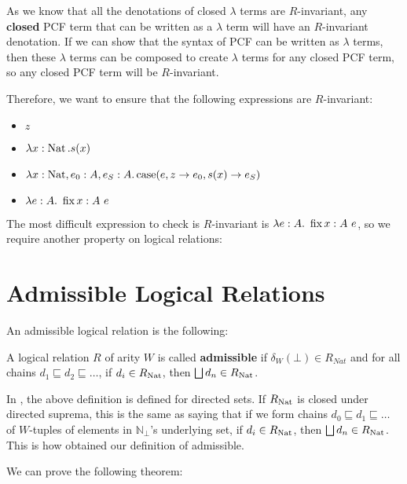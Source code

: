 As we know that all the denotations of closed $\lambda$ terms are $R$-invariant, any \textbf{closed} PCF term that can be written as a $\lambda$ term will have  an $R$-invariant denotation. If we can show that the syntax of PCF can be written as $\lambda$ terms, then these $\lambda$ terms can be composed to create $\lambda$ terms for any closed PCF term, so any closed PCF term will be $R$-invariant.

Therefore, we want to ensure that the following expressions are $R$-invariant:

\begin{itemize}
\item{$z$}
\item{$\lambda x: \operatorname{Nat}. s(x)$}
\item{$\lambda x: \operatorname{Nat}, e_0 : A, e_S: A. \operatorname{case}(e,z \to e_0,s(x) \to e_S)$}
\item{$\lambda e: A . \ \fix x:A \ e $}
\end{itemize} 

The most difficult expression to check is $R$-invariant is $\lambda e: A . \ \fix x:A \ e $, so we require another property on logical relations:

\section{Admissible Logical Relations}

An admissible logical relation is the following:

\vspace{0.5cm}

\begin{defn}
A logical relation $R$ of arity $W$ is called \textbf{admissible} if $\delta_W(\bot) \in R_{Nat}$ and for all chains $d_1 \sqsubseteq d_2 \sqsubseteq \dots$, if  $d_i \in R_{\operatorname{Nat}}$, then $\bigsqcup d_n \in R_{\operatorname{Nat}}$.
\end{defn}

In \citep{Streicher06}, the above definition is defined for directed sets. If $R_{\operatorname{Nat}}$ is closed under directed suprema, this is the same as saying that if we form chains $d_0 \sqsubseteq d_1 \sqsubseteq \dots$ of $W$-tuples of elements in $\mathbb{N}_\bot$'s underlying set, if $d_i \in R_{\operatorname{Nat}}$, then $\bigsqcup d_n \in R_{\operatorname{Nat}}$. This is how obtained our definition of admissible.

We can prove the following theorem:

\vspace{0.5cm}

